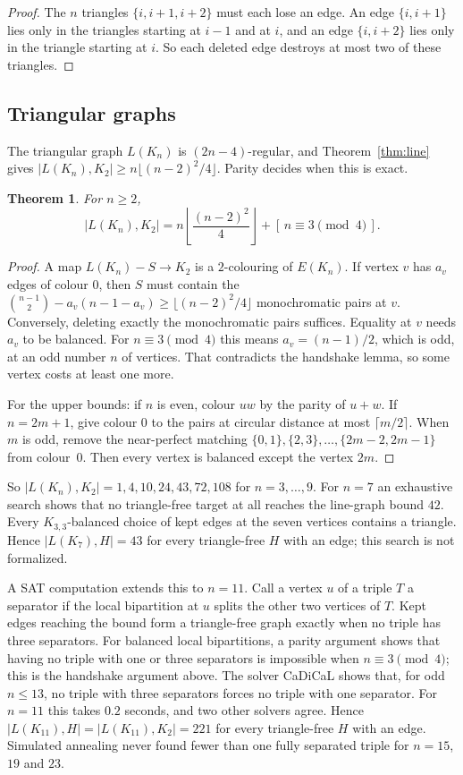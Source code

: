 \documentclass{article}
\newtheorem{theorem}{Theorem}[section]
\theoremstyle{definition}
\begin{document}
\begin{proof}
The $n$ triangles $\{i,i+1,i+2\}$ must each lose an edge.  An edge
$\{i,i+1\}$ lies only in the triangles starting at $i-1$ and at $i$, and an edge
$\{i,i+2\}$ lies only in the triangle starting at $i$.  So each deleted edge
destroys at most two of these triangles.
\end{proof}

\subsection{Triangular graphs}

The triangular graph $L(K_n)$ is $(2n-4)$-regular, and Theorem~\ref{thm:line} gives
$|L(K_n),K_2|\ge n\lfloor(n-2)^2/4\rfloor$.  Parity decides when this is exact.

\begin{theorem}
\label{thm:triangular}
For $n\ge2$,
\[
  |L(K_n),K_2| = n\left\lfloor\frac{(n-2)^2}{4}\right\rfloor + [\,n\equiv3\pmod 4\,].
\]
\end{theorem}

\begin{proof}
A map $L(K_n)-S\to K_2$ is a $2$-colouring of $E(K_n)$.  If vertex $v$ has $a_v$
edges of colour $0$, then $S$ must contain the
$\binom{n-1}2-a_v(n-1-a_v)\ge\lfloor(n-2)^2/4\rfloor$ monochromatic pairs at $v$.
Conversely, deleting exactly the monochromatic pairs suffices.  Equality at $v$
needs $a_v$ to be balanced.  For $n\equiv3\pmod4$ this means $a_v=(n-1)/2$, which is
odd, at an odd number $n$ of vertices.  That contradicts the handshake lemma,
so some vertex costs at least one more.

For the upper bounds: if $n$ is even, colour $uw$ by the parity of $u+w$.  If
$n=2m+1$, give colour $0$ to the pairs at circular distance at most
$\lceil m/2\rceil$.  When $m$ is odd, remove the near-perfect matching
$\{0,1\},\{2,3\},\dots,\{2m-2,2m-1\}$ from colour~$0$.  Then every vertex is
balanced except the vertex $2m$.
\end{proof}

So $|L(K_n),K_2|=1,4,10,24,43,72,108$ for $n=3,\dots,9$.  For $n=7$ an
exhaustive search shows that no triangle-free target at all reaches the
line-graph bound $42$.  Every $K_{3,3}$-balanced choice of kept edges at the
seven vertices contains a triangle.  Hence $|L(K_7),H|=43$ for every triangle-free
$H$ with an edge; this search is not formalized.

A SAT computation extends this to $n=11$.  Call a vertex $u$ of a triple $T$ a
separator if the local bipartition at $u$ splits the other two vertices of $T$.
Kept edges reaching the bound form a triangle-free graph exactly when no triple has
three separators.  For balanced local bipartitions, a parity argument shows that
having no triple with one or three separators is impossible when
$n\equiv3\pmod4$; this is the handshake argument above.  The solver CaDiCaL
shows that, for odd $n\le13$, no triple with three separators forces no triple
with one separator.  For $n=11$ this takes $0.2$ seconds, and two other solvers
agree.  Hence $|L(K_{11}),H|=|L(K_{11}),K_2|=221$ for every triangle-free $H$
with an edge.  Simulated annealing never found fewer than one fully separated
triple for $n=15$, $19$ and $23$.
\end{document}
